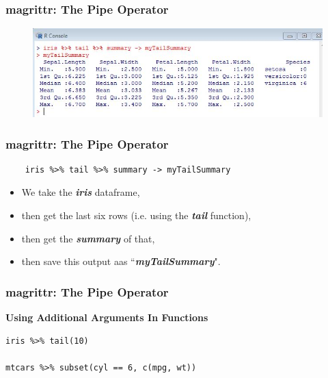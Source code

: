 \documentclass{beamer}
\begin{document}
\begin{frame}
\frametitle{magrittr: The Pipe Operator}
\begin{figure}
\centering
\includegraphics[width=0.99\linewidth]{images/myTailSummary}
\end{figure}

\end{frame}
\begin{frame}[fragile]
\frametitle{magrittr: The Pipe Operator}
\large	
\vspace{-0.9cm}
\begin{framed}
	\begin{verbatim}
	iris %>% tail %>% summary -> myTailSummary
	\end{verbatim}
\end{framed}
{
\begin{itemize}
	\item We take the \textbf{\textit{iris}} dataframe, 
	\item then get the last six rows (i.e. using the \textbf{\textit{tail}} function), 
	\item then get the \textbf{\textit{summary}} of that,
	\item then save this output aas ``\textbf{\textit{myTailSummary}}".
\end{itemize}

}
\end{frame}
\begin{frame}[fragile]
\frametitle{magrittr: The Pipe Operator}
\large	
\vspace{-0.9cm}
\textbf{Using Additional Arguments In Functions}
\begin{framed}
\begin{verbatim}
iris %>% tail(10)
		
mtcars %>% subset(cyl == 6, c(mpg, wt))
\end{verbatim}
\end{framed}
\end{frame}
\end{document}
